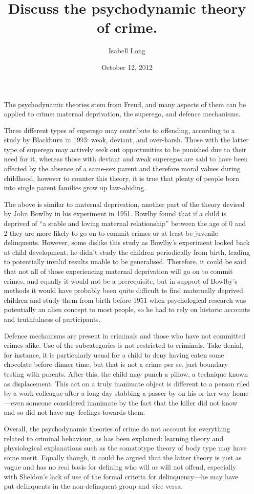 \documentclass{article}
\begin{document}
	
\title{Discuss the psychodynamic theory of crime.}
\author{Isabell Long}
\date{October 12, 2012}
\maketitle

The psychodynamic theories stem from Freud, and many aspects of them can be applied to crime: maternal deprivation, the superego, and defence mechanisms.

Three different types of superego may contribute to offending, according to a study by Blackburn in 1993: weak, deviant, and over-harsh.  Those with the latter type of superego may actively seek out opportunities to be punished due to their need for it, whereas those with deviant and weak superegos are said to have been affected by the absence of a same-sex parent and therefore moral values during childhood, however to counter this theory, it is true that plenty of people born into single parent families grow up law-abiding.

The above is similar to maternal deprivation, another part of the theory devised by John Bowlby in his experiment in 1951.  Bowlby found that if a child is deprived of ``a stable and loving maternal relationship'' between the age of 0 and 2 they are more likely to go on to commit crimes or at least be juvenile delinquents.  However, some dislike this study as Bowlby's experiment looked back at child development, he didn't study the children periodically from birth, leading to potentially invalid results unable to be generalised.  Therefore, it could be said that not all of those experiencing maternal deprivation will go on to commit crimes, and equally it would not be a prerequisite, but in support of Bowlby's methods it would have probably been quite difficult to find maternally deprived children and study them from birth before 1951 when psychological research was potentially an alien concept to most people, so he had to rely on historic accounts and truthfulness of participants.

Defence mechanisms are present in criminals and those who have not committed crimes alike.  Use of the subcategories is not restricted to criminals.  Take denial, for instance, it is particularly usual for a child to deny having eaten some chocolate before dinner time, but that is not a crime per se, just boundary testing with parents.  After this, the child may punch a pillow, a technique known as displacement.  This act on a truly inanimate object is different to a person riled by a work colleague after a long day stabbing a passer by on his or her way home---even someone considered inanimate by the fact that the killer did not know and so did not have any feelings towards them.

Overall, the psychodynamic theories of crime do not account for everything related to criminal behaviour, as has been explained: learning theory and physiological explanations such as the somatotype theory of body type may have some merit.  Equally though, it could be argued that the latter theory is just as vague and has no real basis for defining who will or will not offend, especially with Sheldon's lack of use of the formal criteria for delinquency---he may have put delinquents in the non-delinquent group and vice versa.
\end{document}
